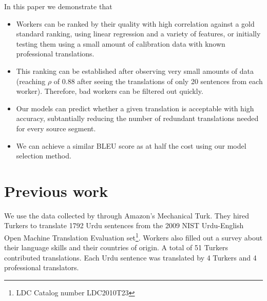 \documentclass[11pt,letterpaper]{article}
\begin{document}
 In this paper we demonstrate that
 \begin{itemize}
 \item Workers can be ranked by their quality with high correlation against a gold standard ranking, using linear regression and a variety of features, or initially testing them using a small amount of calibration data with known professional translations.
 \item This ranking can be established after observing very small amounts of data (reaching $\rho$ of 0.88 after seeing the translations of only 20 sentences from each worker). Therefore, bad workers can be filtered out quickly.
 \item Our models can predict whether a given translation is acceptable with high accuracy, subtantially reducing the number of redundant translations needed for every source segment.
 \item We can achieve a similar BLEU score as  at half the cost using our model selection method.
 \end{itemize} 
 
\section{Previous work}
We use the data collected by   through Amazon's Mechanical Turk. 
They hired Turkers to translate 1792 Urdu sentences 
from the  2009 NIST Urdu-English Open Machine Translation Evaluation set\footnote{LDC Catalog number LDC2010T23}. Workers also filled out a survey about their language skills and their countries of origin.
A total of 51 Turkers contributed translations. Each Urdu sentence was translated by 4 Turkers and 4 professional translators.

\end{document}
